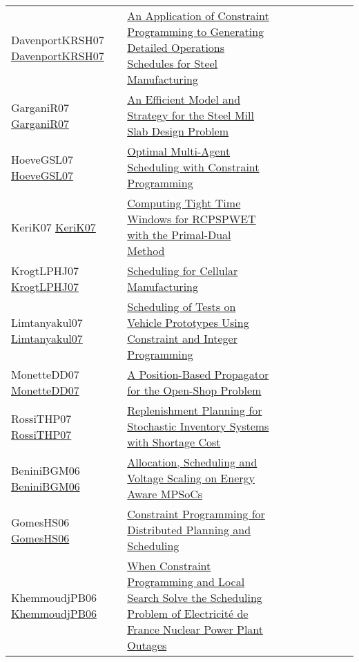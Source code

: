{\begin{longtable}{p{3cm}p{7cm}lllllll}
DavenportKRSH07 \href{https://doi.org/10.1007/978-3-540-74970-7\_7}{DavenportKRSH07} &  \href{papers/DavenportKRSH07.pdf}{An Application of Constraint Programming to Generating Detailed Operations Schedules for Steel Manufacturing} &  &  &  &  &  &  & \\
GarganiR07 \href{https://doi.org/10.1007/978-3-540-74970-7\_8}{GarganiR07} &  \href{papers/GarganiR07.pdf}{An Efficient Model and Strategy for the Steel Mill Slab Design Problem} &  &  &  &  &  &  & \\
HoeveGSL07 \href{http://www.aaai.org/Library/AAAI/2007/aaai07-291.php}{HoeveGSL07} &  \href{papers/HoeveGSL07.pdf}{Optimal Multi-Agent Scheduling with Constraint Programming} &  &  &  &  &  &  & \\
KeriK07 \href{https://doi.org/10.1007/978-3-540-72397-4\_10}{KeriK07} &  \href{papers/KeriK07.pdf}{Computing Tight Time Windows for {RCPSPWET} with the Primal-Dual Method} &  &  &  &  &  &  & \\
KrogtLPHJ07 \href{https://doi.org/10.1007/978-3-540-74970-7\_10}{KrogtLPHJ07} &  \href{papers/KrogtLPHJ07.pdf}{Scheduling for Cellular Manufacturing} &  &  &  &  &  &  & \\
Limtanyakul07 \href{https://doi.org/10.1007/978-3-540-77903-2\_65}{Limtanyakul07} &  \href{papers/Limtanyakul07.pdf}{Scheduling of Tests on Vehicle Prototypes Using Constraint and Integer Programming} &  &  &  &  &  &  & \\
MonetteDD07 \href{https://doi.org/10.1007/978-3-540-72397-4\_14}{MonetteDD07} &  \href{papers/MonetteDD07.pdf}{A Position-Based Propagator for the Open-Shop Problem} &  &  &  &  &  &  & \\
RossiTHP07 \href{https://doi.org/10.1007/978-3-540-72397-4\_17}{RossiTHP07} &  \href{papers/RossiTHP07.pdf}{Replenishment Planning for Stochastic Inventory Systems with Shortage Cost} &  &  &  &  &  &  & \\
BeniniBGM06 \href{https://doi.org/10.1007/11757375\_6}{BeniniBGM06} &  \href{papers/BeniniBGM06.pdf}{Allocation, Scheduling and Voltage Scaling on Energy Aware MPSoCs} &  &  &  &  &  &  & \\
GomesHS06 \href{http://www.aaai.org/Library/Symposia/Spring/2006/ss06-04-024.php}{GomesHS06} &  \href{papers/GomesHS06.pdf}{Constraint Programming for Distributed Planning and Scheduling} &  &  &  &  &  &  & \\
KhemmoudjPB06 \href{https://doi.org/10.1007/11889205\_21}{KhemmoudjPB06} &  \href{papers/KhemmoudjPB06.pdf}{When Constraint Programming and Local Search Solve the Scheduling Problem of Electricit{\'{e}} de France Nuclear Power Plant Outages} &  &  &  &  &  &  & \\

\end{longtable}}
